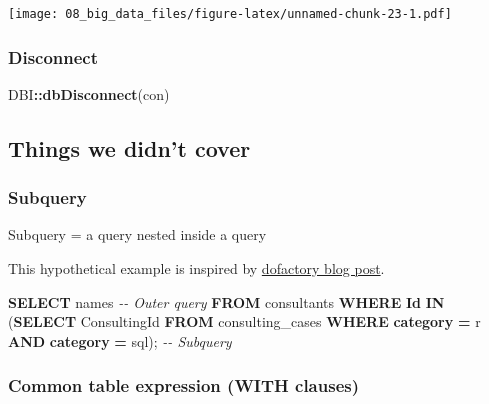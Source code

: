 \documentclass[
]{book}
\newenvironment{Shaded}{\begin{snugshade}}{\end{snugshade}}
\newcommand{\CommentTok}[1]{\textcolor[rgb]{0.56,0.35,0.01}{\textit{#1}}}
\newcommand{\KeywordTok}[1]{\textcolor[rgb]{0.13,0.29,0.53}{\textbf{#1}}}
\newcommand{\NormalTok}[1]{#1}
\newcommand{\OperatorTok}[1]{\textcolor[rgb]{0.81,0.36,0.00}{\textbf{#1}}}
\newcommand{\StringTok}[1]{\textcolor[rgb]{0.31,0.60,0.02}{#1}}
\begin{document}
\texttt{[image: 08\_big\_data\_files/figure-latex/unnamed-chunk-23-1.pdf]}

\hypertarget{disconnect}{%
\subsubsection{Disconnect}\label{disconnect}}

\begin{Shaded}
\begin{Highlighting}[]
\NormalTok{DBI}\OperatorTok{::}\KeywordTok{dbDisconnect}\NormalTok{(con)}
\end{Highlighting}
\end{Shaded}

\hypertarget{things-we-didnt-cover}{%
\subsection{Things we didn't cover}\label{things-we-didnt-cover}}

\hypertarget{subquery}{%
\subsubsection{Subquery}\label{subquery}}

Subquery = a query nested inside a query

This hypothetical example is inspired by \href{https://www.dofactory.com/sql/subquery}{dofactory blog post}.

\begin{Shaded}
\begin{Highlighting}[]
\KeywordTok{SELECT}\NormalTok{ names  }\CommentTok{{-}{-} Outer query }
\KeywordTok{FROM}\NormalTok{ consultants}
\KeywordTok{WHERE} \KeywordTok{Id} \KeywordTok{IN}\NormalTok{ (}\KeywordTok{SELECT}\NormalTok{ ConsultingId}
                \KeywordTok{FROM}\NormalTok{ consulting\_cases }
                \KeywordTok{WHERE} \KeywordTok{category} \OperatorTok{=} \StringTok{\textquotesingle{}r\textquotesingle{}} \KeywordTok{AND} \KeywordTok{category} \OperatorTok{=} \StringTok{\textquotesingle{}sql\textquotesingle{}}\NormalTok{); }\CommentTok{{-}{-} Subquery }
\end{Highlighting}
\end{Shaded}

\hypertarget{common-table-expression-with-clauses}{%
\subsubsection{Common table expression (WITH clauses)}\label{common-table-expression-with-clauses}}
\end{document}
